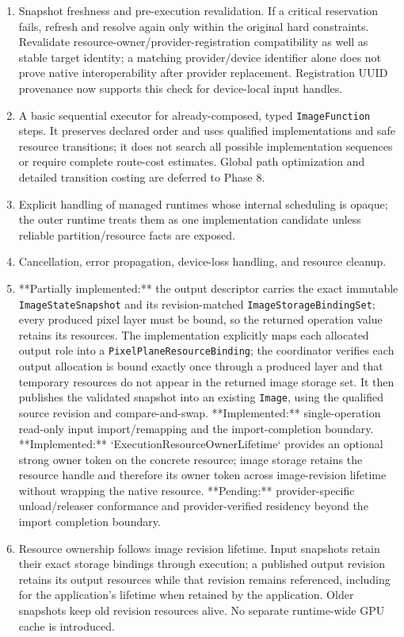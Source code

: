 \begin{enumerate}
  \item Snapshot freshness and pre-execution revalidation. If a critical reservation fails, refresh and resolve again only within the original hard constraints. Revalidate resource-owner/provider-registration compatibility as well as stable target identity; a matching provider/device identifier alone does not prove native interoperability after provider replacement. Registration UUID provenance now supports this check for device-local input handles.
  \item A basic sequential executor for already-composed, typed \texttt{ImageFunction} steps. It preserves declared order and uses qualified implementations and safe resource transitions; it does not search all possible implementation sequences or require complete route-cost estimates. Global path optimization and detailed transition costing are deferred to Phase 8.
  \item Explicit handling of managed runtimes whose internal scheduling is opaque; the outer runtime treats them as one implementation candidate unless reliable partition/resource facts are exposed.
  \item Cancellation, error propagation, device-loss handling, and resource cleanup.
  \item **Partially implemented:** the output descriptor carries the exact immutable \texttt{ImageStateSnapshot} and its revision-matched \texttt{ImageStorageBindingSet}; every produced pixel layer must be bound, so the returned operation value retains its resources. The implementation explicitly maps each allocated output role into a \texttt{PixelPlaneResourceBinding}; the coordinator verifies each output allocation is bound exactly once through a produced layer and that temporary resources do not appear in the returned image storage set. It then publishes the validated snapshot into an existing \texttt{Image}, using the qualified source revision and compare-and-swap. **Implemented:** single-operation read-only input import/remapping and the import-completion boundary. **Implemented:** `ExecutionResourceOwnerLifetime` provides an optional strong owner token on the concrete resource; image storage retains the resource handle and therefore its owner token across image-revision lifetime without wrapping the native resource. **Pending:** provider-specific unload/releaser conformance and provider-verified residency beyond the import completion boundary.
  \item Resource ownership follows image revision lifetime. Input snapshots retain their exact storage bindings through execution; a published output revision retains its output resources while that revision remains referenced, including for the application's lifetime when retained by the application. Older snapshots keep old revision resources alive. No separate runtime-wide GPU cache is introduced.

\end{enumerate}
